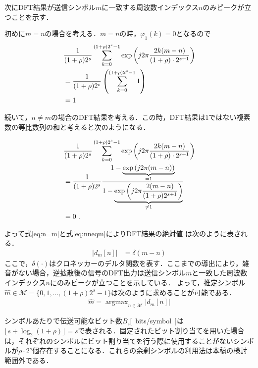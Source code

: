 \documentclass[technicalreport]{ieicej}
\begin{document}
次にDFT結果が送信シンボル$m$に一致する周波数インデックス$n$のみピークが立つことを示す．

初めに$m=n$の場合を考える．$m=n$の時，$\varphi_1(k)=0$となるので
\begin{align}
&\frac{1}{{(1+\rho)2^s}}\sum_{k=0}^{(1+\rho)2^s-1}\exp\left(j2\pi \frac{2k(m-n)}{(1+\rho)  \cdot 2^{s+1}}\right)\notag\\
&=\frac{1}{{(1+\rho)2^s}}\left(\sum_{k=0}^{(1+\rho)2^s-1}1\right)\notag\\
&=1\label{eq:n=m}
\end{align}

続いて，$n\neq m$の場合のDFT結果を考える．この時，DFT結果は$1$ではない複素数の等比数列の和と考えると次のようになる．

\begin{align}
&\frac{1}{{(1+\rho)2^s}}\sum_{k=0}^{(1+\rho)2^s-1}\exp\left(j2\pi \frac{2k(m-n)}{(1+\rho)  \cdot 2^{s+1}}\right)\notag\\
&=\frac{1}{{(1+\rho)2^s}}\frac{1-\underbrace{\exp\left(j2\pi(m-n)\right)}_{=1}}{1-\underbrace{\exp\left(j2\pi \frac{2(m-n)}{(1+\rho)2^{s+1}}\right)}_{\neq 1}}\notag\\
&=0\ .\label{eq:nneqm}
\end{align}

よって式\eqref{eq:n=m}と式\eqref{eq:nneqm}によりDFT結果の絶対値%
は次のように表される．
\begin{align}
|d_m[n]|&=\delta(m-n)
\end{align}
ここで，$\delta(\cdot)$はクロネッカーのデルタ関数を表す．ここまでの導出により，雑音がない場合，逆拡散後の信号のDFT出力は送信シンボル$m$と一致した周波数インデックス$n$にのみピークが立つことを示している．
よって，推定シンボル$\hat{m}\in\mathcal{M}=\{0,1,\ldots,(1+\rho)2^s-1\}$は次のように求めることが可能である．
\begin{align}
\hat{m}=\mathop{\mathrm{argmax}}_{n\in\mathcal{M}}|d_m[n]|
\end{align}

シンボルあたりで伝送可能なビット数$B_\mathrm{s}$\si{[bits/symbol]}は$\lfloor s+\log_2(1+\rho) \rfloor=s$で表される．固定されたビット割り当てを用いた場合は，それぞれのシンボルにビット割り当てを行う際に使用することがないシンボルが$\rho\cdot 2^s$個存在することになる．これらの余剰シンボルの利用法は本稿の検討範囲外である．
\end{document}
